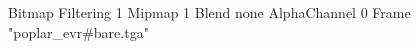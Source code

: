 {Bitmap
	{Filtering 1}
	{Mipmap 1}
	{Blend none}
	{AlphaChannel 0}
	{Frame "poplar_evr#bare.tga"}
}
